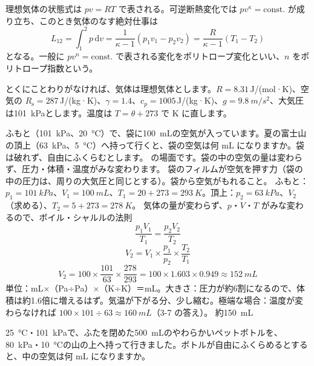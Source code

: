\begin{senmonsho}[理想気体の状態変化]
\begin{bkhonbun}
理想気体の状態式は $pv=RT$ で表される。可逆断熱変化では $pv^{\kappa}=\text{const.}$ が成り立ち、このとき気体のなす絶対仕事は
\[ L_{12}=\int_1^2p\,\mathrm{d}v=\frac{1}{\kappa-1}(p_1v_1-p_2v_2)=\frac{R}{\kappa-1}(T_1-T_2) \]
となる。一般に $pv^n=\text{const.}$ で表される変化をポリトロープ変化といい、$n$ をポリトロープ指数という。
\end{bkhonbun}
\end{senmonsho}


\noindent とくにことわりがなければ、気体は理想気体とします。$R=8.31$\,J/(mol·K)、空気の $R_{\mathrm s}=287$\,J/(kg·K)、$\gamma=1.4$、$c_p=1005$\,J/(kg·K)、$g=\qty{9.8}{m/s^2}$、大気圧は\qty{101}{kPa}とします。温度は $T=\theta+273$ で K に直します。

\begin{phreidai}[山の上のおかしの袋]
\label{ph:熱-3:ex1}ふもと（\qty{101}{kPa}、\qty{20}{\celsius}）で、袋に\qty{100}{mL}の空気が入っています。夏の富士山の頂上（\qty{63}{kPa}、\qty{5}{\celsius}）へ持って行くと、袋の空気は何 mL になりますか。袋は破れず、自由にふくらむとします。
\phbamen
\bkhatenaref の場面です。袋の中の空気の量は変わらず、圧力・体積・温度がみな変わります。
\phmushi
袋のフィルムが空気を押す力（袋の中の圧力は、周りの大気圧と同じとする）。袋から空気がもれること。
\phzu
ふもと：$p_1=\qty{101}{kPa}$、$V_1=\qty{100}{mL}$、$T_1=20+273=\qty{293}{K}$。頂上：$p_2=\qty{63}{kPa}$、$V_2$（求める）、$T_2=5+273=\qty{278}{K}$。
\phriyu
気体の量が変わらず、$p$・$V$・$T$ がみな変わるので、ボイル・シャルルの法則
\[ \frac{p_1V_1}{T_1}=\frac{p_2V_2}{T_2} \]
\phtateru
\[ V_2=V_1\times\frac{p_1}{p_2}\times\frac{T_2}{T_1} \]
\phtoku
\[ V_2=100\times\frac{101}{63}\times\frac{278}{293}=100\times1.603\times0.949\approx\qty{152}{mL} \]
\phtashikame
単位：mL×（Pa÷Pa）×（K÷K）＝mL。大きさ：圧力が約6割になるので、体積は約1.6倍に増えるはず。気温が下がる分、少し縮む。極端な場合：温度が変わらなければ $100\times101\div63\approx\qty{160}{mL}$（3-7 の答え）。
\kotae 約\qty{150}{mL}
\end{phreidai}
\begin{jibun}
\qty{25}{\celsius}・\qty{101}{kPa}で、ふたを閉めた\qty{500}{mL}のやわらかいペットボトルを、\qty{80}{kPa}・\qty{10}{\celsius}の山の上へ持って行きました。ボトルが自由にふくらめるとすると、中の空気は何 mL になりますか。
\end{jibun}

